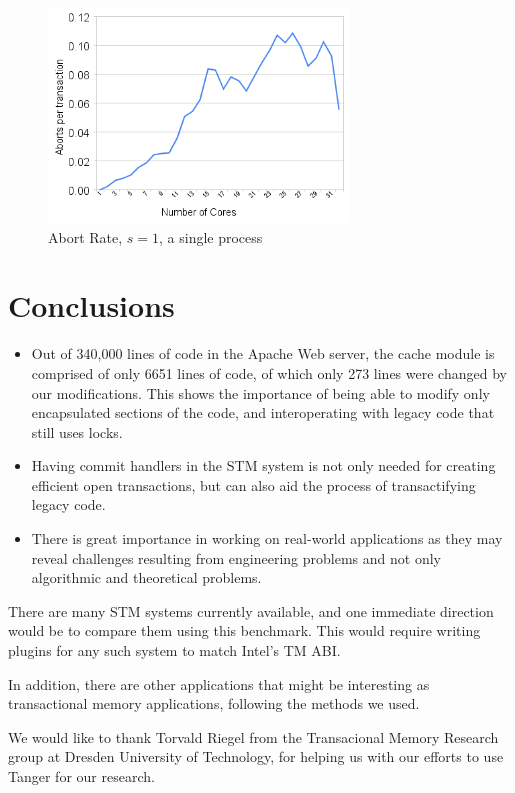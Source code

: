 \documentclass[preprint,natbib,11pt]{sigplanconf}
\begin{document}
\begin{figure}
 \begin{center}
  \includegraphics[width=8cm]{abort-rate.png}
 \end{center}
 \caption{Abort Rate, $s = 1$, a single process}
 \label{fig:abort-rate}
\end{figure}

\section{Conclusions}
\begin{itemize}
  \item Out of 340,000 lines of code in the Apache Web server, the cache module
is comprised of only 6651 lines of code, of which only 273 lines were changed by
our modifications. This shows the importance of being able to modify only
encapsulated sections of the code, and interoperating with legacy code that
still uses locks.  
  \item Having commit handlers in the STM system is not only needed for creating
efficient open transactions, but can also aid the process of transactifying
legacy code.
  \item There is great importance in working on real-world applications as they
may reveal challenges resulting from engineering problems and not only
algorithmic and theoretical problems.
\end{itemize}
There are many STM systems currently available, and one immediate direction
would be to compare them using this benchmark. This would require writing
plugins for any such system to match Intel's TM ABI. 

In addition, there are other applications that might be interesting as
transactional memory applications, following the methods we used.



\acks

We would like to thank Torvald Riegel from the Transacional Memory Research
group at Dresden University of Technology, for helping us with our efforts to
use {\sc Tanger} for our research.



%
%


\end{document}
